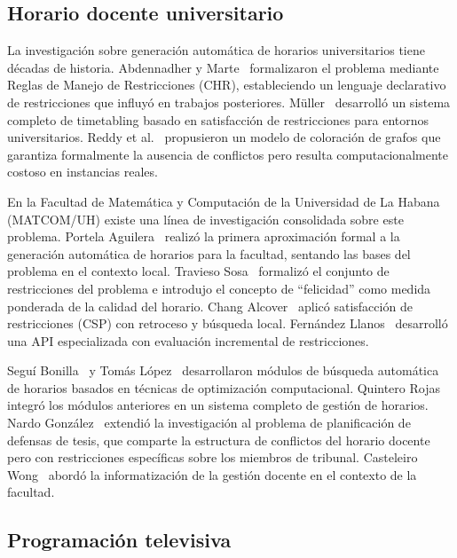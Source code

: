 \subsection{Horario docente universitario}
\label{ssec:arte-facultad}

La investigación sobre generación automática de horarios universitarios tiene
décadas de historia.  Abdennadher y Marte~\cite{abdennadher2000} formalizaron
el problema mediante Reglas de Manejo de Restricciones (CHR), estableciendo
un lenguaje declarativo de restricciones que influyó en trabajos posteriores.
Müller~\cite{muller2005} desarrolló un sistema completo de timetabling basado
en satisfacción de restricciones para entornos universitarios.  Reddy
et al.~\cite{reddy2019} propusieron un modelo de coloración de grafos que
garantiza formalmente la ausencia de conflictos pero resulta computacionalmente
costoso en instancias reales.

En la Facultad de Matemática y Computación de la Universidad de La Habana
(MATCOM/UH) existe una línea de investigación consolidada sobre este problema.
Portela Aguilera~\cite{portela2010} realizó la primera aproximación formal a
la generación automática de horarios para la facultad, sentando las bases del
problema en el contexto local.  Travieso Sosa~\cite{travieso2012} formalizó
el conjunto de restricciones del problema e introdujo el concepto de
``felicidad'' como medida ponderada de la calidad del horario.  Chang
Alcover~\cite{chang2014} aplicó satisfacción de restricciones (CSP) con
retroceso y búsqueda local.  Fernández Llanos~\cite{fernandez_llanos2014}
desarrolló una API especializada con evaluación incremental de restricciones.

Seguí Bonilla~\cite{segui2014} y Tomás López~\cite{tomaslopez2014}
desarrollaron módulos de búsqueda automática de horarios basados en técnicas
de optimización computacional.  Quintero Rojas~\cite{quintero2014} integró
los módulos anteriores en un sistema completo de gestión de horarios.  Nardo
González~\cite{nardo2019} extendió la investigación al problema de
planificación de defensas de tesis, que comparte la estructura de conflictos
del horario docente pero con restricciones específicas sobre los miembros de
tribunal.  Casteleiro Wong~\cite{casteleiro2022} abordó la informatización
de la gestión docente en el contexto de la facultad.

\subsection{Programaci\'on televisiva}
\label{ssec:arte-tv}

